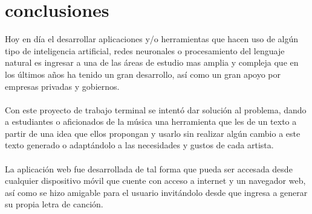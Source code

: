 \section{conclusiones}
Hoy en día el desarrollar aplicaciones y/o herramientas que hacen uso de algún tipo de inteligencia artificial, redes neuronales o procesamiento del lenguaje natural es ingresar a una de las áreas de estudio mas amplia y compleja que en los últimos años ha tenido un gran desarrollo, así como un gran apoyo por empresas privadas y gobiernos.\\\\
Con este proyecto de trabajo terminal se intentó dar solución al problema, dando a estudiantes o aficionados de la música una herramienta que les de un texto a partir de una idea que ellos propongan y usarlo sin realizar algún cambio a este texto generado o adaptándolo a las necesidades y gustos de cada artista.\\\\
La aplicación web fue desarrollada de tal forma que pueda ser accesada desde cualquier dispositivo móvil que cuente con acceso a internet y un navegador web, así como se hizo amigable para el usuario invitándolo desde que ingresa a generar su propia letra de canción. 
